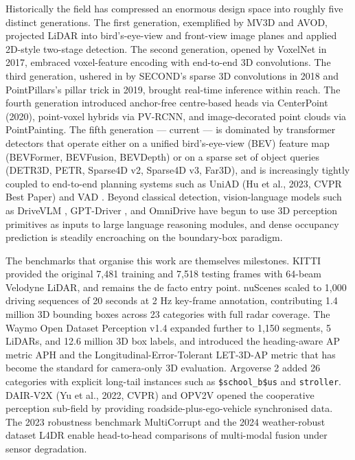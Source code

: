 \documentclass{article}
\begin{document}
Historically the field has compressed an enormous design space into roughly five distinct generations. The first generation, exemplified by MV3D and AVOD, projected LiDAR into bird's-eye-view and front-view image planes and applied 2D-style two-stage detection. The second generation, opened by VoxelNet in 2017, embraced voxel-feature encoding with end-to-end 3D convolutions. The third generation, ushered in by SECOND's sparse 3D convolutions in 2018 and PointPillars's pillar trick in 2019, brought real-time inference within reach. The fourth generation introduced anchor-free centre-based heads via CenterPoint (2020), point-voxel hybrids via PV-RCNN, and image-decorated point clouds via PointPainting. The fifth generation --- current --- is dominated by transformer detectors that operate either on a unified bird's-eye-view (BEV) feature map (BEVFormer, BEVFusion, BEVDepth) or on a sparse set of object queries (DETR3D, PETR, Sparse4D v2, Sparse4D v3, Far3D), and is increasingly tightly coupled to end-to-end planning systems such as UniAD (Hu et al., 2023, CVPR Best Paper) and VAD \citep{jiang2023polarformermultica}. Beyond classical detection, vision-language models such as DriveVLM \citep{tian2024drivevlmtheconverg}, GPT-Driver \citep{mao20233dobjectdetectionf}, and OmniDrive \citep{wang2024omnidriveaholistic} have begun to use 3D perception primitives as inputs to large language reasoning modules, and dense occupancy prediction is steadily encroaching on the boundary-box paradigm.

The benchmarks that organise this work are themselves milestones. KITTI provided the original 7,481 training and 7,518 testing frames with 64-beam Velodyne LiDAR, and remains the de facto entry point. nuScenes scaled to 1,000 driving sequences of 20 seconds at 2 Hz key-frame annotation, contributing 1.4 million 3D bounding boxes across 23 categories with full radar coverage. The Waymo Open Dataset Perception v1.4 expanded further to 1,150 segments, 5 LiDARs, and 12.6 million 3D box labels, and introduced the heading-aware AP metric APH and the Longitudinal-Error-Tolerant LET-3D-AP metric \citep{hung2022let3daplongitudina} that has become the standard for camera-only 3D evaluation. Argoverse 2 added 26 categories with explicit long-tail instances such as \texttt{\$school\_b\$us} and \texttt{stroller}. DAIR-V2X (Yu et al., 2022, CVPR) and OPV2V opened the cooperative perception sub-field by providing roadside-plus-ego-vehicle synchronised data. The 2023 robustness benchmark MultiCorrupt \citep{beemelmanns2024multicorruptamulti} and the 2024 weather-robust dataset L4DR enable head-to-head comparisons of multi-modal fusion under sensor degradation.
\end{document}
